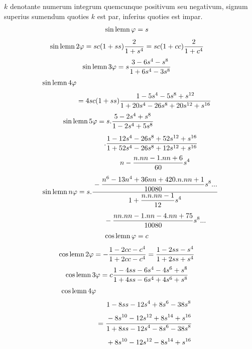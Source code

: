 $k$ denotante numerum integrum quemcunque positivum seu negativum, signum superius sumendum quoties $k$ est par, inferius quoties est impar.
\[
\begin{aligned}\operatorname{sin\,lemn}\varphi&=s\end{aligned}
\]
\[
\begin{aligned}\operatorname{sin\,lemn}2\varphi&=sc(1+ss)\dfrac2{1+s^4}=sc(1+cc)\dfrac2{1+c^4}\end{aligned}
\]
\[
\begin{aligned}\operatorname{sin\,lemn}3\varphi&=s\dfrac{3-6s^4-s^8}{1+6s^4-3s^8}\end{aligned}
\]
\[
\begin{aligned}\operatorname{sin\,lemn}4\varphi\\[3pt]&=4sc(1+ss)\dfrac{1-5s^4-5s^8+s^{12}}{1+20s^4-26s^8+20s^{12}+s^{16}}\end{aligned}
\]
\[
\begin{aligned}\operatorname{sin\,lemn}5\varphi&=s.\dfrac{5-2s^4+s^8}{1-2s^4+5s^8}\\[5pt]&\quad .\dfrac{1-12s^4-26s^8+52s^{12}+s^{16}}{1+52s^4-26s^8+12s^{12}+s^{16}}\end{aligned}
\]
\[
\operatorname{sin\,lemn} n\varphi=s.\dfrac{\begin{gathered}n-\dfrac{n.nn-1.nn+6}{60}s^4\\[5pt]{}-\dfrac{n^6-13n^4+36nn+420.n.nn+1}{10080}s^8\mathord{.}\mathord{.}\mathord{.}\end{gathered}}{\begin{gathered}1+\dfrac{n.n.nn-1}{12}s^4\\[5pt]{}-\dfrac{nn.nn-1.nn-4.nn+75}{10080}s^8\mathord{.}\mathord{.}\mathord{.}\end{gathered}}
\]
\[
\begin{aligned}\operatorname{cos\,lemn}\varphi&=c\end{aligned}
\]
\[
\begin{aligned}\operatorname{cos\,lemn}2\varphi&=-\dfrac{1-2cc-c^4}{1+2cc-c^4}=\dfrac{1-2ss-s^4}{1+2ss+s^4}\end{aligned}
\]
\[
\begin{aligned}\operatorname{cos\,lemn}3\varphi&=c\dfrac{1-4ss-6s^4-4s^6+s^8}{1+4ss-6s^4+4s^6+s^8}\end{aligned}
\]
\[
\begin{aligned}\operatorname{cos\,lemn}4\varphi\\[3pt]&=\dfrac{\begin{gathered}1-8ss-12s^4+8s^6-38s^8\\[3pt]{}-8s^{10}-12s^{12}+8s^{14}+s^{16}\end{gathered}}{\begin{gathered}1+8ss-12s^4-8s^6-38s^8\\[3pt]{}+8s^{10}-12s^{12}-8s^{14}+s^{16}\end{gathered}}\end{aligned}
\]
